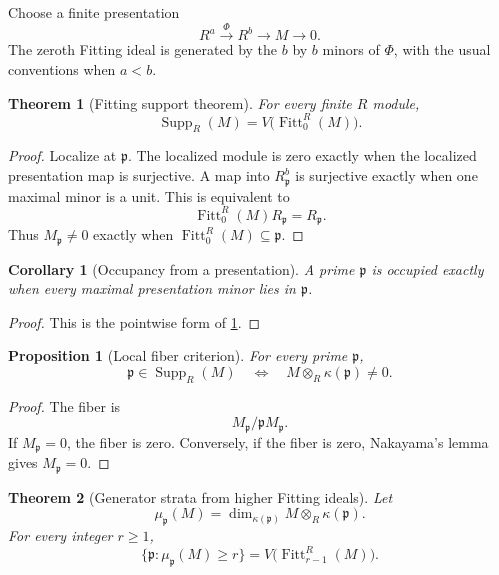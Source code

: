 \documentclass{aomart}
\newtheorem{theorem}{Theorem}[section]
\newtheorem{proposition}[proposition]{Proposition}
\newtheorem{corollary}[corollary]{Corollary}
\theoremstyle{definition}
\theoremstyle{remark}
\newcommand{\Supp}{\operatorname{Supp}}
\newcommand{\Fitt}{\operatorname{Fitt}}
\begin{document}
Choose a finite presentation
\[
R^a\xrightarrow{\Phi}R^b\longrightarrow M\longrightarrow0.
\]
The zeroth Fitting ideal is generated by the \(b\) by \(b\) minors of \(\Phi\), with the usual conventions when \(a<b\).

\begin{theorem}[Fitting support theorem]\label{thm:fitting_support}
For every finite \(R\) module,
\[
\boxed{
\Supp_R(M)
=
V\bigl(\Fitt_0^R(M)\bigr).
}
\]
\end{theorem}

\begin{proof}
Localize at \(\mathfrak p\). The localized module is zero exactly when the localized presentation map is surjective. A map into \(R_{\mathfrak p}^b\) is surjective exactly when one maximal minor is a unit. This is equivalent to
\[
\Fitt_0^R(M)R_{\mathfrak p}=R_{\mathfrak p}.
\]
Thus \(M_{\mathfrak p}\neq0\) exactly when \(\Fitt_0^R(M)\subseteq\mathfrak p\).
\end{proof}

\begin{corollary}[Occupancy from a presentation]\label{cor:occupancy_minors}
A prime \(\mathfrak p\) is occupied exactly when every maximal presentation minor lies in \(\mathfrak p\).
\end{corollary}

\begin{proof}
This is the pointwise form of \cref{thm:fitting_support}.
\end{proof}

\begin{proposition}[Local fiber criterion]\label{prop:local_fiber_criterion}
For every prime \(\mathfrak p\),
\[
\boxed{
\mathfrak p\in\Supp_R(M)
\quad\Longleftrightarrow\quad
M\otimes_R\kappa(\mathfrak p)\neq0.
}
\]
\end{proposition}

\begin{proof}
The fiber is
\[
M_{\mathfrak p}/\mathfrak pM_{\mathfrak p}.
\]
If \(M_{\mathfrak p}=0\), the fiber is zero. Conversely, if the fiber is zero, Nakayama's lemma gives \(M_{\mathfrak p}=0\).
\end{proof}

\begin{theorem}[Generator strata from higher Fitting ideals]\label{thm:fitting_generator_strata}
Let
\[
\mu_{\mathfrak p}(M)
=
\dim_{\kappa(\mathfrak p)}
M\otimes_R\kappa(\mathfrak p).
\]
For every integer \(r\geq1\),
\[
\boxed{
\{\mathfrak p:\mu_{\mathfrak p}(M)\geq r\}
=
V\bigl(\Fitt_{r-1}^R(M)\bigr).
}
\]
\end{theorem}
\end{document}
